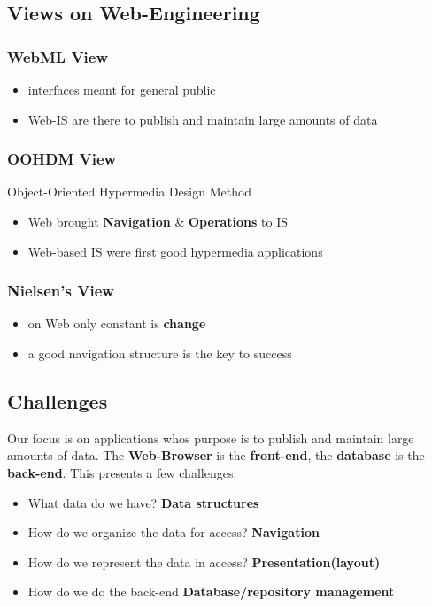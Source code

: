 \documentclass[a4paper]{article}
\begin{document}
	\subsection{Views on Web-Engineering}
		\subsubsection{WebML View}
			\begin{itemize}
			\setlength{\itemsep}{-3pt}
			\item interfaces meant for general public
			\item Web-IS are there to publish and maintain large amounts of data
			\end{itemize}
		\subsubsection{OOHDM View}
			Object-Oriented Hypermedia Design Method
			\begin{itemize}
			\setlength{\itemsep}{-3pt}
			\item Web brought {\bf Navigation} \& {\bf Operations} to IS
			\item Web-based IS were first good hypermedia applications
			\end{itemize}
		\subsubsection{Nielsen's View}
			\begin{itemize}
			\setlength{\itemsep}{-3pt}
			\item on Web only constant is {\bf change}
			\item a good navigation structure is the key to success
			\end{itemize}
	\newpage
	\subsection{Challenges}
		Our focus is on applications whos purpose is to publish and maintain large amounts of data.
		The {\bf Web-Browser} is the {\bf front-end}, the {\bf database} is the {\bf back-end}.
		This presents a few challenges:\\
		\begin{itemize}
		\setlength{\itemsep}{-3pt}
		\item What data do we have? {\bf Data structures}
		\item How do we organize the data for access? {\bf Navigation}
		\item How do we represent the data in access? {\bf Presentation(layout)}
		\item How do we do the back-end {\bf Database/repository management}
		\end{itemize}
\end{document}
